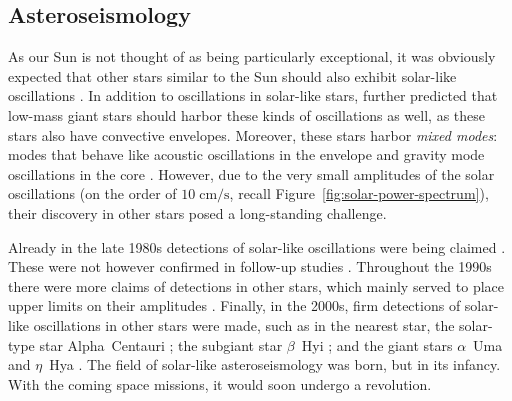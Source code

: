 \subsection{Asteroseismology}
As our Sun is not thought of as being particularly exceptional, it was obviously expected that other stars similar to the Sun should also exhibit solar-like oscillations \citep[e.g.,][]{1984srps.conf...11C}. 
In addition to oscillations in solar-like stars, \citet{1983SoPh...82..469C} further predicted that low-mass giant stars should harbor these kinds of oscillations as well, as these stars also have convective envelopes. %
Moreover, these stars harbor \emph{mixed modes}: modes that behave like acoustic oscillations in the envelope and gravity mode oscillations in the core \citep[e.g.,][]{2001MNRAS.328..601D}. 
However, due to the very small amplitudes of the solar oscillations (on the order of ${10\; \text{cm/s}}$, recall Figure~\ref{fig:solar-power-spectrum}), their discovery in other stars posed a long-standing challenge. 


Already in the late 1980s detections of solar-like oscillations were being claimed \citep{1986A&A...164..383G}. 
These were not however confirmed in follow-up studies \citep[e.g.,][]{1991MNRAS.249..643I}. 
Throughout the 1990s there were more claims of detections in other stars, which mainly served to place upper limits on their amplitudes \citep[e.g.,][]{1990ApJ...350..839B, 1991ApJ...368..599B, 1992A&A...264..138P, 1995MNRAS.276.1295E}. 
Finally, in the 2000s, firm detections of solar-like oscillations in other stars were made, such as in the nearest star, the solar-type star Alpha~Centauri \citep{2001A&A...374L...5B}; 
the subgiant star $\beta$~Hyi \citep{2001ApJ...549L.105B}; 
and the giant stars $\alpha$~Uma \citep{2000ApJ...532L.133B} and $\eta$~Hya \citep{2002A&A...394L...5F}. 
The field of solar-like asteroseismology was born, but in its infancy. 
With the coming space missions, it would soon undergo a revolution. 





